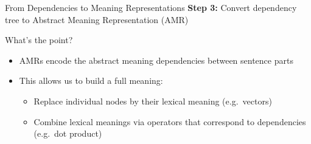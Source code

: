 \documentclass[xcolor={usenames,svgnames,x11names,dvipsnames,table}]{beamer}
\begin{document}
\begin{frame}{From Dependencies to Meaning Representations}
    \textbf{Step 3:} Convert dependency tree to Abstract Meaning Representation (AMR)
    \begin{center}
    \end{center}

    \pause
    \begin{block}{What's the point?}
        \begin{itemize}
            \item AMRs encode the abstract meaning dependencies between sentence parts
            \item This allows us to build a full meaning:
                \begin{itemize}
                    \item Replace individual nodes by their lexical meaning (e.g.\ vectors)
                    \item Combine lexical meanings via operators that correspond to dependencies (e.g.\ dot product)
                \end{itemize}
        \end{itemize}
    \end{block}
\end{frame}
\end{document}
